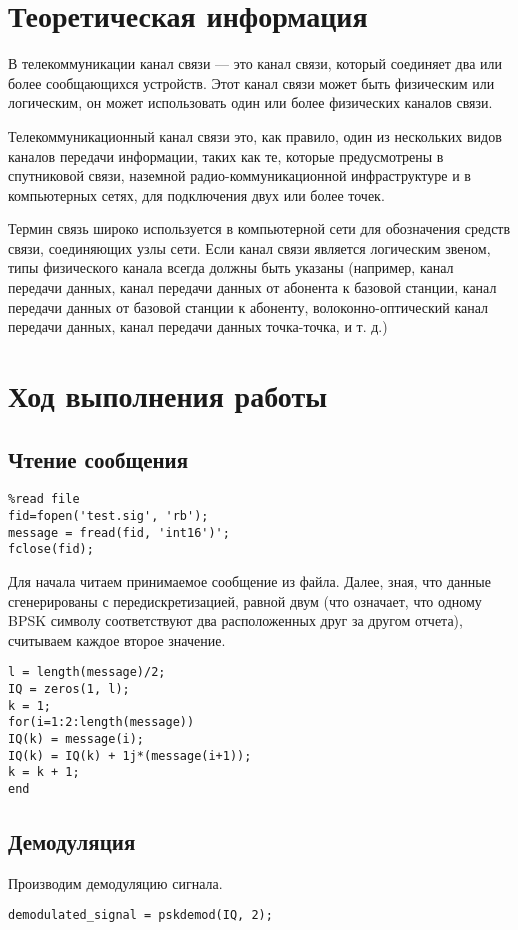 \newpage
\section{Теоретическая информация}
В телекоммуникации канал связи — это канал связи, который соединяет два или более сообщающихся устройств. Этот канал связи может быть физическим или логическим, он может использовать один или более физических каналов связи.

Телекоммуникационный канал связи это, как правило, один из нескольких видов каналов передачи информации, таких как те, которые предусмотрены в спутниковой связи, наземной радио-коммуникационной инфраструктуре и в компьютерных сетях, для подключения двух или более точек.

Термин связь широко используется в компьютерной сети для обозначения средств связи, соединяющих узлы сети. Если канал связи является логическим звеном, типы физического канала всегда должны быть указаны (например, канал передачи данных, канал передачи данных от абонента к базовой станции, канал передачи данных от базовой станции к абоненту, волоконно-оптический канал передачи данных, канал передачи данных точка-точка, и т. д.)

\section{Ход выполнения работы}
\subsection{Чтение сообщения}
\begin{lstlisting}
%read file
fid=fopen('test.sig', 'rb');
message = fread(fid, 'int16')';
fclose(fid);
\end{lstlisting}
Для начала читаем принимаемое сообщение из файла. Далее, зная, что данные сгенерированы с передискретизацией, равной двум (что означает, что одному BPSK символу соответствуют два расположенных друг за другом отчета), считываем каждое второе значение.
\begin{lstlisting}
l = length(message)/2;
IQ = zeros(1, l);
k = 1;
for(i=1:2:length(message))
IQ(k) = message(i);
IQ(k) = IQ(k) + 1j*(message(i+1));
k = k + 1;
end
\end{lstlisting}


\subsection{Демодуляция}
Производим демодуляцию сигнала.
\begin{lstlisting}
demodulated_signal = pskdemod(IQ, 2);
\end{lstlisting}

